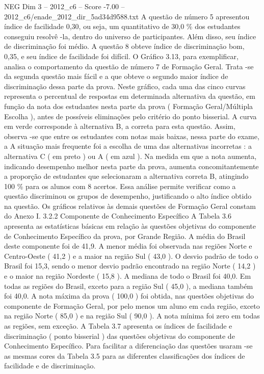 \begin{textsample}{NEG Dim 3 – 2012\_c6 – Score -7.00 – 2012\_c6/enade\_2012\_dir\_5ad34d9588.txt}
A questão de número 5 apresentou índice de facilidade 0,30, ou seja, um quantitativo de 30,0 \% dos estudantes conseguiu resolvê -la, dentro do universo de participantes.
Além disso, seu índice de discriminação foi médio.
A questão 8 obteve índice de discriminação bom, 0,35, e seu índice de facilidade foi difícil.
O Gráfico 3.13, para exemplificar, analisa o comportamento da questão de número 7 de Formação Geral.
Trata -se da segunda questão mais fácil e a que obteve o segundo maior índice de discriminação dessa parte da prova.
Neste gráfico, cada uma das cinco curvas representa o percentual de respostas em determinada alternativa da questão, em função da nota dos estudantes nesta parte da prova ( Formação Geral/Múltipla Escolha ), antes de possíveis eliminações pelo critério do ponto bisserial.
A curva em verde corresponde à alternativa B, a correta para esta questão.
Assim, observa -se que entre os estudantes com notas mais baixas, nessa parte do exame, a A situação mais frequente foi a escolha de uma das alternativas incorretas : a alternativa C ( em preto ) ou A ( em azul ).
Na medida em que a nota aumenta, indicando desempenho melhor nesta parte da prova, aumenta concomitantemente a proporção de estudantes que selecionaram a alternativa correta B, atingindo 100 \% para os alunos com 8 acertos.
Essa análise permite verificar como a questão discriminou os grupos de desempenho, justificando o alto índice obtido na questão.
Os gráficos relativos às demais questões de Formação Geral constam do Anexo I. 3.2.2 Componente de Conhecimento Específico A Tabela 3.6 apresenta as estatísticas básicas em relação às questões objetivas do componente de Conhecimento Específico da prova, por Grande Região.
A média do Brasil deste componente foi de 41,9.
A menor média foi observada nas regiões Norte e Centro-Oeste ( 41,2 ) e a maior na região Sul ( 43,0 ).
O desvio padrão de todo o Brasil foi 15,3, sendo o menor desvio padrão encontrado na região Norte ( 14,2 ) e o maior na região Nordeste ( 15,8 ).
A mediana de todo o Brasil foi 40,0.
Em todas as regiões do Brasil, exceto para a região Sul ( 45,0 ), a mediana também foi 40,0.
A nota máxima da prova ( 100,0 ) foi obtida, nas questões objetivas do componente de Formação Geral, por pelo menos um aluno em cada região, exceto na região Norte ( 85,0 ) e na região Sul ( 90,0 ).
A nota mínima foi zero em todas as regiões, sem exceção.
A Tabela 3.7 apresenta os índices de facilidade e discriminação ( ponto bisserial ) das questões objetivas do componente de Conhecimento Específico.
Para facilitar a diferenciação das questões usaram -se as mesmas cores da Tabela 3.5 para as diferentes classificações dos índices de facilidade e de discriminação.

\end{textsample}
